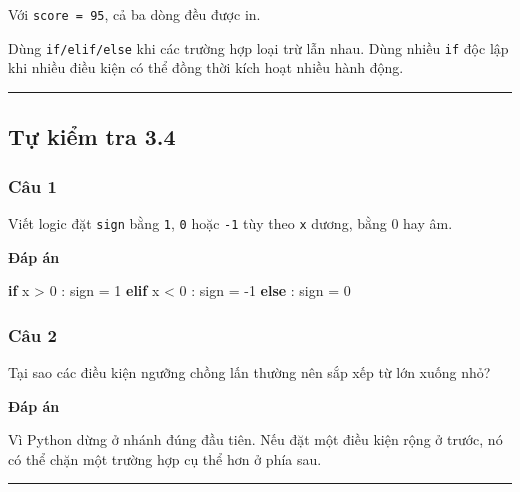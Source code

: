 \documentclass[
  11pt,
  a4paper,
]{article}
\newenvironment{Shaded}{}{}
\newcommand{\ControlFlowTok}[1]{\textcolor[rgb]{0.00,0.44,0.13}{\textbf{#1}}}
\newcommand{\DecValTok}[1]{\textcolor[rgb]{0.25,0.63,0.44}{#1}}
\newcommand{\NormalTok}[1]{#1}
\newcommand{\OperatorTok}[1]{\textcolor[rgb]{0.40,0.40,0.40}{#1}}
\begin{document}
Với \texttt{score\ =\ 95}, cả ba dòng đều được in.

Dùng \texttt{if/elif/else} khi các trường hợp loại trừ lẫn nhau. Dùng
nhiều \texttt{if} độc lập khi nhiều điều kiện có thể đồng thời kích hoạt
nhiều hành động.

\begin{center}\rule{0.5\linewidth}{0.5pt}\end{center}

\subsection{Tự kiểm tra 3.4}\label{tux1ef1-kiux1ec3m-tra-3.4}

\subsubsection{Câu 1}\label{cuxe2u-1-3}

Viết logic đặt \texttt{sign} bằng \texttt{1}, \texttt{0} hoặc
\texttt{-1} tùy theo \texttt{x} dương, bằng 0 hay âm.

\textbf{Đáp án}

\begin{Shaded}
\begin{Highlighting}[]
\ControlFlowTok{if}\NormalTok{ x }\OperatorTok{\textgreater{}} \DecValTok{0}\NormalTok{ :}
\NormalTok{    sign }\OperatorTok{=} \DecValTok{1}
\ControlFlowTok{elif}\NormalTok{ x }\OperatorTok{\textless{}} \DecValTok{0}\NormalTok{ :}
\NormalTok{    sign }\OperatorTok{=} \OperatorTok{{-}}\DecValTok{1}
\ControlFlowTok{else}\NormalTok{ :}
\NormalTok{    sign }\OperatorTok{=} \DecValTok{0}
\end{Highlighting}
\end{Shaded}

\subsubsection{Câu 2}\label{cuxe2u-2-3}

Tại sao các điều kiện ngưỡng chồng lấn thường nên sắp xếp từ lớn xuống
nhỏ?

\textbf{Đáp án}

Vì Python dừng ở nhánh đúng đầu tiên. Nếu đặt một điều kiện rộng ở
trước, nó có thể chặn một trường hợp cụ thể hơn ở phía sau.

\begin{center}\rule{0.5\linewidth}{0.5pt}\end{center}
\end{document}
